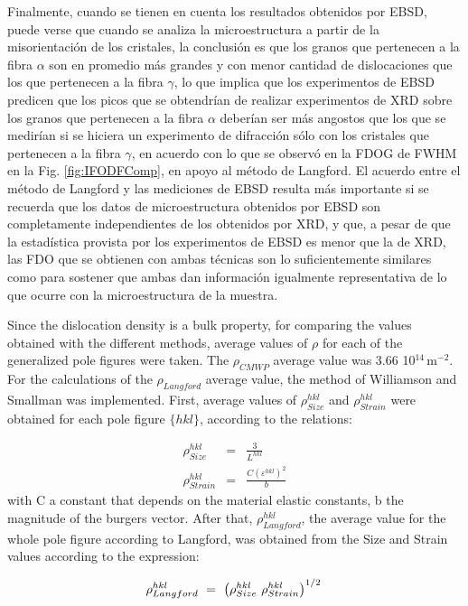 Finalmente, cuando se tienen en cuenta los resultados obtenidos por EBSD, puede verse que cuando se analiza la microestructura a partir de la misorientación de los cristales, la conclusión es que los granos que pertenecen a la fibra $\alpha$ son en promedio más grandes y con menor cantidad de dislocaciones que los que pertenecen a la fibra $\gamma$, lo que implica que los experimentos de EBSD predicen que los picos que se obtendrían de realizar experimentos de XRD sobre los granos que pertenecen a la fibra $\alpha$ deberían ser más angostos que los que se medirían si se hiciera un experimento de difracción sólo con los cristales que pertenecen a la fibra $\gamma$, en acuerdo con lo que se observó en la FDOG de FWHM en la Fig. \ref{fig:IFODFComp}, en apoyo al método de Langford.
El acuerdo entre el método de Langford y las mediciones de EBSD resulta más importante si se recuerda que los datos de microestructura obtenidos por EBSD son completamente independientes de los obtenidos por XRD, y que, a pesar de que la estadística provista por los experimentos de EBSD es menor que la de XRD, las FDO que se obtienen con ambas técnicas son lo suficientemente similares como para sostener que ambas dan información igualmente representativa de lo que ocurre con la microestructura de la muestra.

Since the dislocation density is a bulk property, for comparing the values obtained with the different methods, average values of $\rho$ for each of the generalized pole figures were taken.
The $\rho_{CMWP}$ average value was 3.66 10$^{14}$\,m$^{-2}$. For the calculations of the $\rho_{Langford}$ average value, the method of Williamson and Smallman was implemented\cite{Williamson1956a}.  First, average values of $\rho_{Size}^{hkl}$ and $\rho_{Strain}^{hkl}$ were obtained for each pole figure $\{ hkl\}$, according to the relations:

\begin{eqnarray}
 \rho_{Size}^{hkl} & = & \frac{3}{L^{hkl}} \\
 \rho_{Strain}^{hkl} & = & \frac{C \left( \varepsilon^{hkl} \right)^2}{b}
 \label{eq:WS1}
\end{eqnarray}
\noindent
with C a constant that depends on the material elastic constants, b the magnitude of the burgers vector. After that, $\rho_{Langford}^{hkl}$, the average value for the whole pole figure according to Langford, was obtained from the Size and Strain values according to the expression:

\begin{equation}
  \rho_{Langford}^{hkl} \ = \ \left(  \rho_{Size}^{hkl} \ \rho_{Strain}^{hkl} \right)^{1/2} \\
  \label{eq:WS2}
\end{equation}

